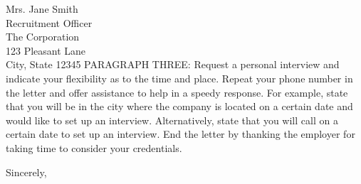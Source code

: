 \documentclass[11pt]{letter}
\begin{document}
\begin{letter}{Mrs. Jane Smith \\
Recruitment Officer \\
The Corporation \\
123 Pleasant Lane \\
City, State 12345}
PARAGRAPH THREE: Request a personal interview and indicate your flexibility as
to the time and place. Repeat your phone number in the letter and offer
assistance to help in a speedy response. For example, state that you will be in
the city where the company is located on a certain date and would like to set up
an interview. Alternatively, state that you will call on a certain date to set
up an interview. End the letter by thanking the employer for taking time to
consider your credentials.

\closing{Sincerely,}



\end{letter}
\end{document}
